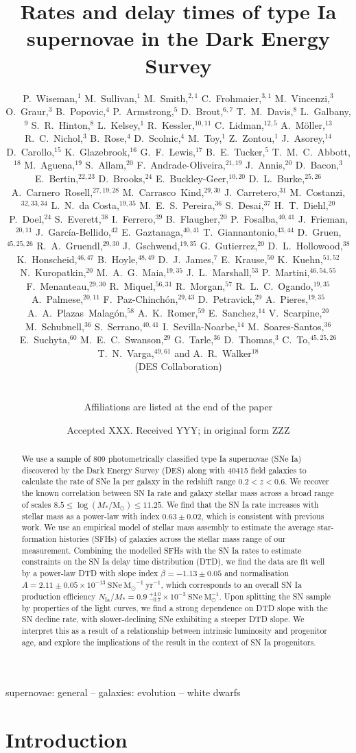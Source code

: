 \documentclass[fleqn,usenatbib]{mnras}
\title[Rates of SNe Ia in DES]{Rates and delay times of type Ia supernovae in the Dark Energy Survey}
\author[P. Wiseman et al.]{\parbox{\textwidth}{
\Large
P.~Wiseman,$^{1}$
M.~Sullivan,$^{1}$
M.~Smith,$^{2,1}$
C.~Frohmaier,$^{3,1}$
M.~Vincenzi,$^{3}$
O.~Graur,$^{3}$
B.~Popovic,$^{4}$
P.~Armstrong,$^{5}$
D.~Brout,$^{6,7}$
T.~M.~Davis,$^{8}$
L.~Galbany,$^{9}$
S.~R.~Hinton,$^{8}$
L.~Kelsey,$^{1}$
R.~Kessler,$^{10,11}$
C.~Lidman,$^{12,5}$
A.~M\"oller,$^{13}$
R.~C.~Nichol,$^{3}$
B.~Rose,$^{4}$
D.~Scolnic,$^{4}$
M.~Toy,$^{1}$
Z.~Zontou,$^{1}$
J.~Asorey,$^{14}$
D.~Carollo,$^{15}$
K.~Glazebrook,$^{16}$
G.~F.~Lewis,$^{17}$
B.~E.~Tucker,$^{5}$
T.~M.~C.~Abbott,$^{18}$
M.~Aguena,$^{19}$
S.~Allam,$^{20}$
F.~Andrade-Oliveira,$^{21,19}$
J.~Annis,$^{20}$
D.~Bacon,$^{3}$
E.~Bertin,$^{22,23}$
D.~Brooks,$^{24}$
E.~Buckley-Geer,$^{10,20}$
D.~L.~Burke,$^{25,26}$
A.~Carnero~Rosell,$^{27,19,28}$
M.~Carrasco~Kind,$^{29,30}$
J.~Carretero,$^{31}$
M.~Costanzi,$^{32,33,34}$
L.~N.~da Costa,$^{19,35}$
M.~E.~S.~Pereira,$^{36}$
S.~Desai,$^{37}$
H.~T.~Diehl,$^{20}$
P.~Doel,$^{24}$
S.~Everett,$^{38}$
I.~Ferrero,$^{39}$
B.~Flaugher,$^{20}$
P.~Fosalba,$^{40,41}$
J.~Frieman,$^{20,11}$
J.~Garc\'ia-Bellido,$^{42}$
E.~Gaztanaga,$^{40,41}$
T.~Giannantonio,$^{43,44}$
D.~Gruen,$^{45,25,26}$
R.~A.~Gruendl,$^{29,30}$
J.~Gschwend,$^{19,35}$
G.~Gutierrez,$^{20}$
D.~L.~Hollowood,$^{38}$
K.~Honscheid,$^{46,47}$
B.~Hoyle,$^{48,49}$
D.~J.~James,$^{7}$
E.~Krause,$^{50}$
K.~Kuehn,$^{51,52}$
N.~Kuropatkin,$^{20}$
M.~A.~G.~Maia,$^{19,35}$
J.~L.~Marshall,$^{53}$
P.~Martini,$^{46,54,55}$
F.~Menanteau,$^{29,30}$
R.~Miquel,$^{56,31}$
R.~Morgan,$^{57}$
R.~L.~C.~Ogando,$^{19,35}$
A.~Palmese,$^{20,11}$
F.~Paz-Chinch\'{o}n,$^{29,43}$
D.~Petravick,$^{29}$
A.~Pieres,$^{19,35}$
A.~A.~Plazas~Malag\'on,$^{58}$
A.~K.~Romer,$^{59}$
E.~Sanchez,$^{14}$
V.~Scarpine,$^{20}$
M.~Schubnell,$^{36}$
S.~Serrano,$^{40,41}$
I.~Sevilla-Noarbe,$^{14}$
M.~Soares-Santos,$^{36}$
E.~Suchyta,$^{60}$
M.~E.~C.~Swanson,$^{29}$
G.~Tarle,$^{36}$
D.~Thomas,$^{3}$
C.~To,$^{45,25,26}$
T.~N.~Varga,$^{49,61}$
and A.~R.~Walker$^{18}$
\begin{center} (DES Collaboration) \end{center}
}
\vspace{0.4cm}
\\
\parbox{\textwidth}{Affiliations are listed at the end of the paper}
}
\date{Accepted XXX. Received YYY; in original form ZZZ}
\begin{document}
\label{firstpage}
\pagerange{\pageref{firstpage}--\pageref{lastpage}}
\maketitle

\begin{abstract}
We use a sample of 809 photometrically classified type Ia supernovae (SNe Ia) discovered by the Dark Energy Survey (DES) along with 40415 field galaxies to calculate the rate of SNe Ia per galaxy in the redshift range $0.2 < z <0.6$. We recover the known correlation between SN Ia rate and galaxy stellar mass across a broad range of scales $8.5 \leq \log(M_*/\mathrm{M}_{\odot}) \leq 11.25$. We find that the SN Ia rate increases with stellar mass as a power-law with index $0.63 \pm 0.02$, which is consistent with previous work. We use an empirical model of stellar mass assembly to estimate the average star-formation histories (SFHs) of galaxies across the stellar mass range of our measurement. Combining the modelled SFHs with the SN Ia rates to estimate constraints on the SN Ia delay time distribution (DTD), we find the data are fit well by a power-law DTD with slope index $\beta = -1.13 \pm 0.05$ and normalisation $A = 2.11 \pm0.05 \times 10^{-13}~\mathrm{SNe}~{\mathrm{M}_{\odot}}^{-1}~\mathrm{yr}^{-1}$, which corresponds to an overall SN Ia production efficiency $N_{\mathrm{Ia}}/M_* = 0.9~_{-0.7}^{+4.0} \times 10^{-3}~\mathrm{SNe}~\mathrm{M}_{\odot}^{-1}$. Upon splitting the SN sample by properties of the light curves, we find a strong dependence on DTD slope with the SN decline rate, with slower-declining SNe exhibiting a steeper DTD slope. We interpret this as a result of a relationship between intrinsic luminosity and progenitor age, and explore the implications of the result in the context of SN Ia progenitors.
\end{abstract}

\begin{keywords}
supernovae: general -- galaxies: evolution -- white dwarfs
\end{keywords}



\section{Introduction}
\end{document}
